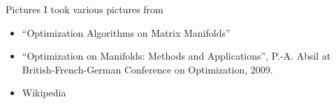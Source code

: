 \documentclass[xcolor=dvipsnames,t]{beamer} %
\begin{document}
\begin{frame}{Pictures}
   I took various pictures from
   
   \begin{itemize}
      \item ``Optimization Algorithms on Matrix Manifolds''
      \item ``Optimization on Manifolds: Methods and Applications'', P.-A. Absil at British-French-German Conference on Optimization, 2009.
      \item Wikipedia
   \end{itemize}

\end{frame}

%
%      
%
%
%
%
%
\end{document}
